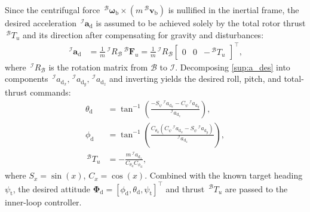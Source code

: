 \documentclass[10pt,journal]{IEEEtran}
\begin{document}
Since the centrifugal force $\,^\mathcal{B}\boldsymbol{\omega}_{\text{b}}\times(m\,^\mathcal{B}\boldsymbol{v}_{\text{b}})$ is nullified in the inertial frame, the desired acceleration $\,^\mathcal{I}\boldsymbol{a}_{\text{d}}$ is assumed to be achieved solely by the total rotor thrust $\,^\mathcal{B}T_u$ and its direction after compensating for gravity and disturbances:
\begin{align} \label{sup:a_des}
    \,^\mathcal{I}\boldsymbol{a}_{\text{d}} &= \frac{1}{m}\,^\mathcal{I}R_\mathcal{B}\,^\mathcal{B}\boldsymbol{F}_u = \frac{1}{m}\,^\mathcal{I}R_\mathcal{B}\begin{bmatrix} 0 & 0 & -\,^\mathcal{B}T_u \end{bmatrix}^\top,
\end{align}
where $\,^\mathcal{I}R_\mathcal{B}$ is the rotation matrix from $\mathcal{B}$ to $\mathcal{I}$. Decomposing \eqref{sup:a_des} into components $\,^\mathcal{I}a_{\text{d}_x},\,^\mathcal{I}a_{\text{d}_y},\,^\mathcal{I}a_{\text{d}_z}$ and inverting yields the desired roll, pitch, and total-thrust commands:
\begin{align} \label{sup:euler_thrust_des}
    \theta_{\text{d}} &= \tan^{-1}\!\left(\tfrac{-S_\psi\,^\mathcal{I}a_{\text{d}_x} - C_\psi\,^\mathcal{I}a_{\text{d}_y}}{\,^\mathcal{I}a_{\text{d}_z}}\right), \nonumber \\
    \phi_{\text{d}} &= \tan^{-1}\!\left(\tfrac{C_{\theta_\text{d}}(C_\psi\,^\mathcal{I}a_{\text{d}_x} - S_\psi\,^\mathcal{I}a_{\text{d}_y})}{\,^\mathcal{I}a_{\text{d}_z}}\right), \nonumber \\
    \,^\mathcal{B}T_u &= -\tfrac{m\,^\mathcal{I}a_{\text{d}_z}}{C_{\theta_\text{d}}C_{\phi_\text{d}}},
\end{align}
where $S_x=\sin(x)$, $C_x=\cos(x)$. Combined with the known target heading $\psi_\text{t}$, the desired attitude $\boldsymbol{\Phi}_\text{d}=[\phi_\text{d},\theta_\text{d},\psi_\text{t}]^\top$ and thrust $\,^\mathcal{B}T_u$ are passed to the inner-loop controller.
\end{document}
